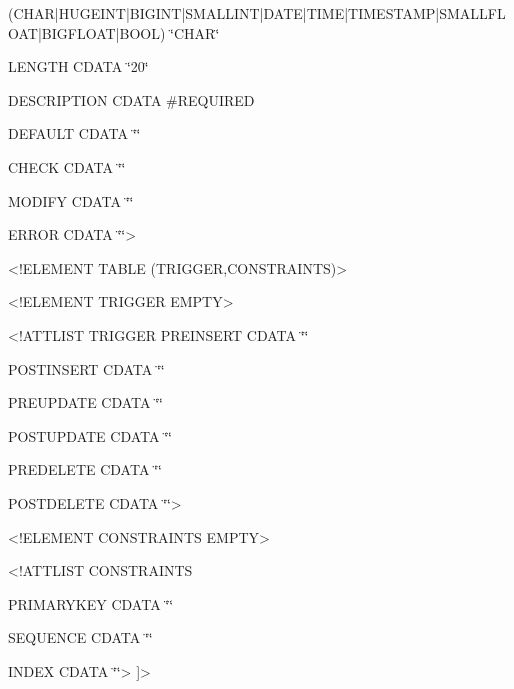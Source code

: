 \begin{table}[htbp]
{\scriptsize (CHAR|HUGEINT|BIGINT|SMALLINT|DATE|TIME|TIMESTAMP|SMALLFLOAT|BIGFLOAT|BOOL)
\char`\"{}CHAR\char`\"{}}{\scriptsize \par}

{\scriptsize LENGTH CDATA \char`\"{}20\char`\"{}}{\scriptsize \par}

{\scriptsize DESCRIPTION CDATA \#REQUIRED}{\scriptsize \par}

{\scriptsize DEFAULT CDATA \char`\"{}\char`\"{}}{\scriptsize \par}

{\scriptsize CHECK CDATA \char`\"{}\char`\"{}}{\scriptsize \par}

{\scriptsize MODIFY CDATA \char`\"{}\char`\"{}}{\scriptsize \par}

{\scriptsize ERROR CDATA \char`\"{}\char`\"{}>}{\scriptsize \par}

{\scriptsize <!ELEMENT TABLE (TRIGGER,CONSTRAINTS)> }{\scriptsize \par}

{\scriptsize <!ELEMENT TRIGGER EMPTY>}{\scriptsize \par}

{\scriptsize <!ATTLIST TRIGGER PREINSERT CDATA \char`\"{}\char`\"{}}{\scriptsize \par}

{\scriptsize POSTINSERT CDATA \char`\"{}\char`\"{}}{\scriptsize \par}

{\scriptsize PREUPDATE CDATA \char`\"{}\char`\"{}}{\scriptsize \par}

{\scriptsize POSTUPDATE CDATA \char`\"{}\char`\"{}}{\scriptsize \par}

{\scriptsize PREDELETE CDATA \char`\"{}\char`\"{}}{\scriptsize \par}

{\scriptsize POSTDELETE CDATA \char`\"{}\char`\"{}>}{\scriptsize \par}

{\scriptsize <!ELEMENT CONSTRAINTS EMPTY>}{\scriptsize \par}

{\scriptsize <!ATTLIST CONSTRAINTS }{\scriptsize \par}

{\scriptsize PRIMARYKEY CDATA \char`\"{}\char`\"{}}{\scriptsize \par}

{\scriptsize SEQUENCE CDATA \char`\"{}\char`\"{}}{\scriptsize \par}

{\scriptsize INDEX CDATA \char`\"{}\char`\"{}> {]}>}
\end{table}



